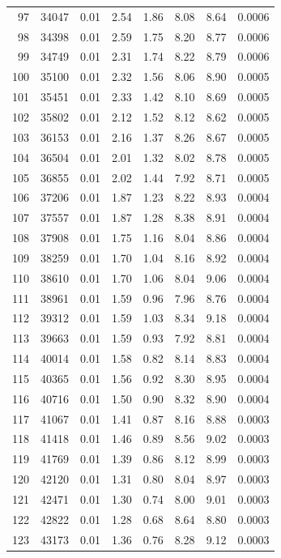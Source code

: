 \documentclass[11pt,a4paper]{article}
\begin{document}
\begin{center}
\begin{longtable}{@{}rrrrrrrr@{}}
97 & 34047 & 0.01 & 2.54 & 1.86 & 8.08 & 8.64 & 0.0006 \\
98 & 34398 & 0.01 & 2.59 & 1.75 & 8.20 & 8.77 & 0.0006 \\
99 & 34749 & 0.01 & 2.31 & 1.74 & 8.22 & 8.79 & 0.0006 \\
100 & 35100 & 0.01 & 2.32 & 1.56 & 8.06 & 8.90 & 0.0005 \\
101 & 35451 & 0.01 & 2.33 & 1.42 & 8.10 & 8.69 & 0.0005 \\
102 & 35802 & 0.01 & 2.12 & 1.52 & 8.12 & 8.62 & 0.0005 \\
103 & 36153 & 0.01 & 2.16 & 1.37 & 8.26 & 8.67 & 0.0005 \\
104 & 36504 & 0.01 & 2.01 & 1.32 & 8.02 & 8.78 & 0.0005 \\
105 & 36855 & 0.01 & 2.02 & 1.44 & 7.92 & 8.71 & 0.0005 \\
106 & 37206 & 0.01 & 1.87 & 1.23 & 8.22 & 8.93 & 0.0004 \\
107 & 37557 & 0.01 & 1.87 & 1.28 & 8.38 & 8.91 & 0.0004 \\
108 & 37908 & 0.01 & 1.75 & 1.16 & 8.04 & 8.86 & 0.0004 \\
109 & 38259 & 0.01 & 1.70 & 1.04 & 8.16 & 8.92 & 0.0004 \\
110 & 38610 & 0.01 & 1.70 & 1.06 & 8.04 & 9.06 & 0.0004 \\
111 & 38961 & 0.01 & 1.59 & 0.96 & 7.96 & 8.76 & 0.0004 \\
112 & 39312 & 0.01 & 1.59 & 1.03 & 8.34 & 9.18 & 0.0004 \\
113 & 39663 & 0.01 & 1.59 & 0.93 & 7.92 & 8.81 & 0.0004 \\
114 & 40014 & 0.01 & 1.58 & 0.82 & 8.14 & 8.83 & 0.0004 \\
115 & 40365 & 0.01 & 1.56 & 0.92 & 8.30 & 8.95 & 0.0004 \\
116 & 40716 & 0.01 & 1.50 & 0.90 & 8.32 & 8.90 & 0.0004 \\
117 & 41067 & 0.01 & 1.41 & 0.87 & 8.16 & 8.88 & 0.0003 \\
118 & 41418 & 0.01 & 1.46 & 0.89 & 8.56 & 9.02 & 0.0003 \\
119 & 41769 & 0.01 & 1.39 & 0.86 & 8.12 & 8.99 & 0.0003 \\
120 & 42120 & 0.01 & 1.31 & 0.80 & 8.04 & 8.97 & 0.0003 \\
121 & 42471 & 0.01 & 1.30 & 0.74 & 8.00 & 9.01 & 0.0003 \\
122 & 42822 & 0.01 & 1.28 & 0.68 & 8.64 & 8.80 & 0.0003 \\
123 & 43173 & 0.01 & 1.36 & 0.76 & 8.28 & 9.12 & 0.0003 \\

\end{longtable}
\end{center}
\end{document}

